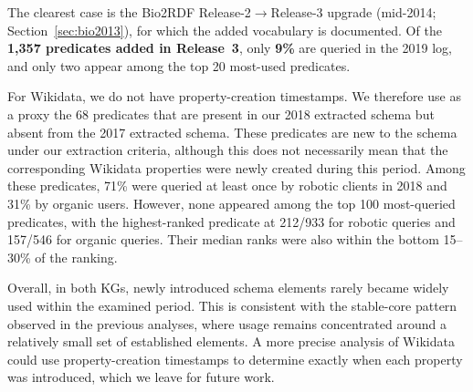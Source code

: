 \documentclass[sw]{iosart2x}
\begin{document}

The clearest case is the Bio2RDF Release-2$\to$Release-3 upgrade (mid-2014; Section~\ref{sec:bio2013}), for which the added vocabulary is documented. Of the \textbf{1{,}357 predicates added in Release~3}, only \textbf{9\%} are queried in the 2019 log, and only two appear among the top 20 most-used predicates.

For Wikidata, we do not have property-creation timestamps. We therefore use as a proxy the 68 predicates that are present in our 2018 extracted schema but absent from the 2017 extracted schema. These predicates are new to the schema under our extraction criteria, although this does not necessarily mean that the corresponding Wikidata properties were newly created during this period. Among these predicates, 71\% were queried at least once by robotic clients in 2018 and 31\% by organic users. However, none appeared among the top 100 most-queried predicates, with the highest-ranked predicate at 212/933 for robotic queries and 157/546 for organic queries. Their median ranks were also within the bottom 15--30\% of the ranking.

Overall, in both KGs, newly introduced schema elements rarely became widely used within the examined period. This is consistent with the stable-core pattern observed in the previous analyses, where usage remains concentrated around a relatively small set of established elements. A more precise analysis of Wikidata could use property-creation timestamps to determine exactly when each property was introduced, which we leave for future work.
\end{document}

